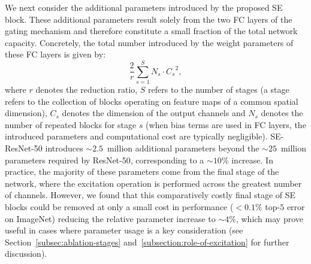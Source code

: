 We next consider the additional parameters introduced by the proposed SE block.  These additional parameters result solely from the two FC layers of the gating mechanism and therefore constitute a small fraction of the total network capacity.  Concretely, the total number introduced by the weight parameters of these FC layers is given by: 
\vspace{-1mm}
\begin{equation}
\label{model_capacity}
\frac{2}{r} \sum_{s=1}^S N_s \cdot {C_s}^2,
\end{equation}
where $r$ denotes the reduction ratio, $S$ refers to the number of stages (a stage refers to the collection of blocks operating on feature maps of a common spatial dimension), $C_s$ denotes the dimension of the output channels and $N_s$ denotes the number of repeated blocks for stage $s$ (when bias terms are used in FC layers, the introduced parameters and computational cost are typically negligible).
\mbox{SE-ResNet-50} introduces \mbox{${\sim}2.5$ million} additional parameters beyond the \mbox{${\sim}25$ million} parameters required by \mbox{ResNet-50}, corresponding to a ${\sim}10\%$ increase. In practice, the majority of these parameters come from the final stage of the network, where the excitation operation is performed across the greatest number of channels. However, we found that this comparatively costly final stage of SE blocks could be removed at only a small cost in performance (${<}0.1\%$ top-$5$ error on ImageNet) reducing the relative parameter increase to ${\sim}4\%$, which may prove useful in cases where parameter usage is a key consideration (see Section~\ref{subsec:ablation-stages} and~\ref{subsection:role-of-excitation} for further discussion).